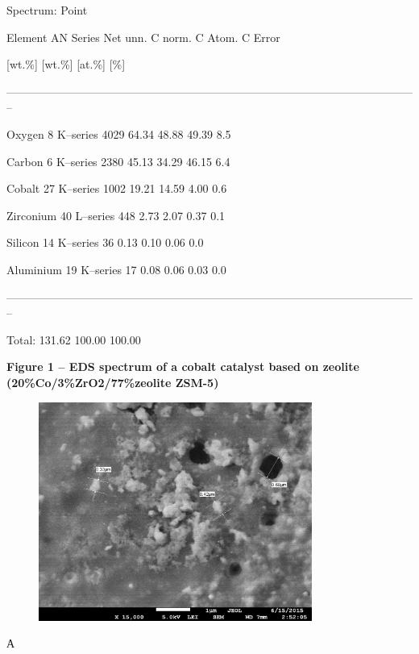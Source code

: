 Spectrum: Point

Element AN Series Net unn. C norm. C Atom. C Error

{[}wt.\%{]} {[}wt.\%{]} {[}at.\%{]} {[}\%{]}

--------------------------------------------------------------------------------------------------------------

Oxygen 8 K--series 4029 64.34 48.88 49.39 8.5

Carbon 6 K--series 2380 45.13 34.29 46.15 6.4

Cobalt 27 K--series 1002 19.21 14.59 4.00 0.6

Zirconium 40 L--series 448 2.73 2.07 0.37 0.1

Silicon 14 K--series 36 0.13 0.10 0.06 0.0

Aluminium 19 K--series 17 0.08 0.06 0.03 0.0

--------------------------------------------------------------------------------------------------------------

Total: 131.62 100.00 100.00

{\bfseries Figure 1 -- EDS spectrum of a cobalt catalyst based on zeolite
(20\%Co/3\%ZrO2/77\%zeolite ZSM-5)}

\begin{figure}[H]
	\centering
	\includegraphics[width=0.8\textwidth]{assets/1077}
	\caption*{}
\end{figure}

А

